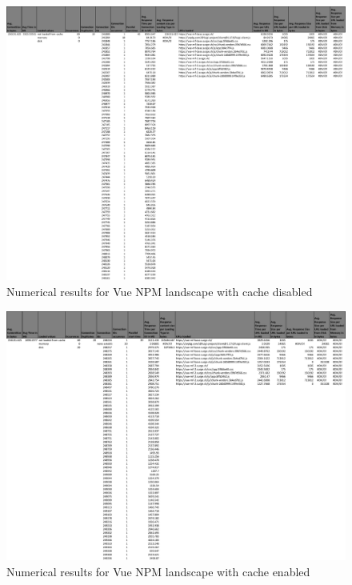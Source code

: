 \begin{figure}[!h]
	\centering
	\begin{adjustbox}{width=\textwidth,totalheight=0.9\textheight}
		\includegraphics[angle=90]{Figures/vue_npm_allhar.pdf}
	\end{adjustbox}
	\caption{Numerical results for Vue NPM landscape with cache disabled}
	\label{fig:appendix_1_11}
\end{figure}
\newpage
\begin{figure}[!h]
	\centering
	\begin{adjustbox}{width=\textwidth,totalheight=0.95\textheight}
		\includegraphics[angle=90]{Figures/vue_npm_allhar_cache.pdf}
	\end{adjustbox}
	\caption{Numerical results for Vue NPM landscape with cache enabled}
	\label{fig:appendix_1_12}
\end{figure}
